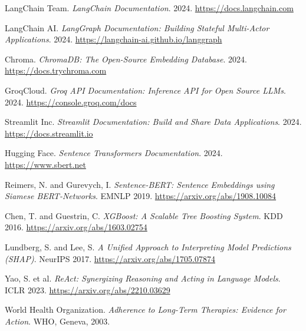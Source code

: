 \documentclass[12pt, a4paper]{report}
\begin{document}
\begin{enumerate}[label={[\arabic*]}, leftmargin=2em, itemsep=6pt]
  \item LangChain Team. \textit{LangChain Documentation}. 2024. \url{https://docs.langchain.com}
  \item LangChain AI. \textit{LangGraph Documentation: Building Stateful Multi-Actor Applications}. 2024. \url{https://langchain-ai.github.io/langgraph}
  \item Chroma. \textit{ChromaDB: The Open-Source Embedding Database}. 2024. \url{https://docs.trychroma.com}
  \item GroqCloud. \textit{Groq API Documentation: Inference API for Open Source LLMs}. 2024. \url{https://console.groq.com/docs}
  \item Streamlit Inc. \textit{Streamlit Documentation: Build and Share Data Applications}. 2024. \url{https://docs.streamlit.io}
  \item Hugging Face. \textit{Sentence Transformers Documentation}. 2024. \url{https://www.sbert.net}
  \item Reimers, N. and Gurevych, I. \textit{Sentence-BERT: Sentence Embeddings using Siamese BERT-Networks}. EMNLP 2019. \url{https://arxiv.org/abs/1908.10084}
  \item Chen, T. and Guestrin, C. \textit{XGBoost: A Scalable Tree Boosting System}. KDD 2016. \url{https://arxiv.org/abs/1603.02754}
  \item Lundberg, S. and Lee, S. \textit{A Unified Approach to Interpreting Model Predictions (SHAP)}. NeurIPS 2017. \url{https://arxiv.org/abs/1705.07874}
  \item Yao, S. et al. \textit{ReAct: Synergizing Reasoning and Acting in Language Models}. ICLR 2023. \url{https://arxiv.org/abs/2210.03629}
  \item World Health Organization. \textit{Adherence to Long-Term Therapies: Evidence for Action}. WHO, Geneva, 2003.
\end{enumerate}
\end{document}
